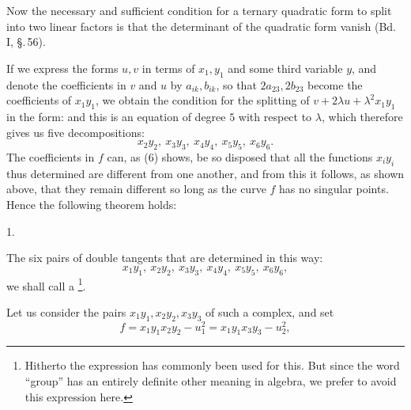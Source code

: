 Now the necessary and sufficient condition for a ternary quadratic form to split into two linear factors is that the determinant of the quadratic form vanish (Bd. I, \S.\,56).

If we express the forms $u, v$ in terms of $x_1, y_1$ and some third variable $y$, and denote the coefficients in $v$ and $u$ by $a_{ik}, b_{ik}$, so that $2a_{23}, 2b_{23}$ become the coefficients of $x_1 y_1$, we obtain the condition for the splitting of $v + 2\lambda u + \lambda^2 x_1 y_1$ in the form:
and this is an equation of degree $5$ with respect to $\lambda$, which therefore gives us five decompositions:
\[
x_2 y_2,\ x_3 y_3,\ x_4 y_4,\ x_5 y_5,\ x_6 y_6.
\]
The coefficients in $f$ can, as (6) shows, be so disposed that all the functions $x_i y_i$ thus determined are different from one another, and from this it follows, as shown above, that they remain different so long as the curve $f$ has no singular points. Hence the following theorem holds:

1. 

The six pairs of double tangents that are determined in this way:
\[
x_1 y_1,\ x_2 y_2,\ x_3 y_3,\ x_4 y_4,\ x_5 y_5,\ x_6 y_6,
\]
we shall call a \footnote{Hitherto the expression  has commonly been used for this. But since the word ``group'' has an entirely definite other meaning in algebra, we prefer to avoid this expression here.}.

Let us consider the pairs $x_1 y_1, x_2 y_2, x_3 y_3$ of such a complex, and set
\[
f = x_1 y_1 x_2 y_2 - u_1^2 = x_1 y_1 x_3 y_3 - u_2^2,
\]
